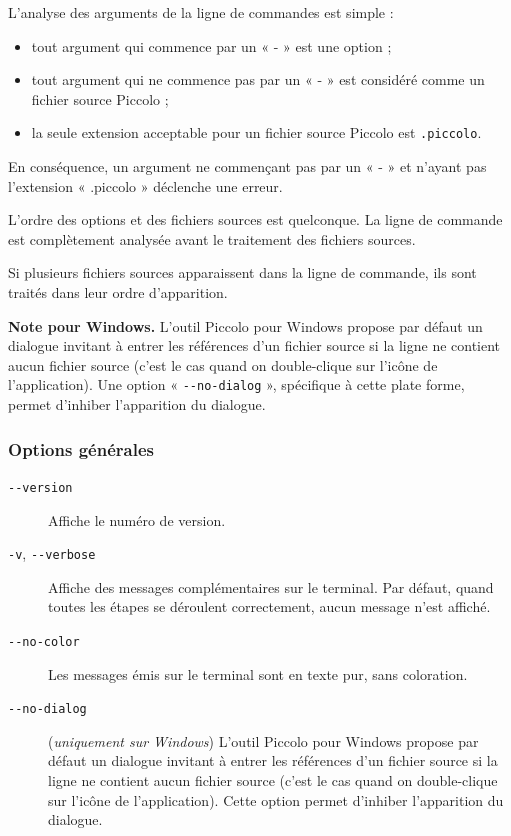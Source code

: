 L’analyse des arguments de la ligne de commandes est simple :
\begin{itemize}
  \item tout argument qui commence par un « - » est une option ;
  \item tout argument qui ne commence pas par un « - » est considéré comme un fichier source Piccolo ;
  \item la seule extension acceptable pour un fichier source Piccolo est \texttt{.piccolo}.
\end{itemize}

En conséquence, un argument ne commençant pas par un « - » et n’ayant pas l’extension « .piccolo » déclenche une erreur.

L’ordre des options et des fichiers sources est quelconque. La ligne de commande est complètement analysée avant le traitement des fichiers sources.

Si plusieurs fichiers sources apparaissent dans la ligne de commande, ils sont traités dans leur ordre d’apparition.

{\bf Note pour Windows.} L’outil Piccolo pour Windows propose par défaut un dialogue invitant à entrer les références d’un fichier source si la ligne ne contient aucun fichier source (c’est le cas quand on double-clique sur l’icône de l’application). Une option « \texttt{-{-}no-dialog} », spécifique à cette plate forme, permet d'inhiber l’apparition du dialogue.

\subsubsection{Options générales}

\begin{description}
  \item[\texttt{-{-}version}] Affiche le numéro de version.

  \item[\texttt{-v}, \texttt{-{-}verbose}] Affiche des messages complémentaires sur le terminal. Par défaut, quand toutes les étapes se déroulent correctement, aucun message n’est affiché.

  \item[\texttt{-{-}no-color}] Les messages émis sur le terminal sont en texte pur, sans coloration.

  \item[\texttt{-{-}no-dialog}] (\emph{uniquement sur Windows}) L’outil Piccolo pour Windows propose par défaut un dialogue invitant à entrer les références d’un fichier source si la ligne ne contient aucun fichier source (c’est le cas quand on double-clique sur l’icône de l’application). Cette option permet d'inhiber l’apparition du dialogue.
\end{description}



